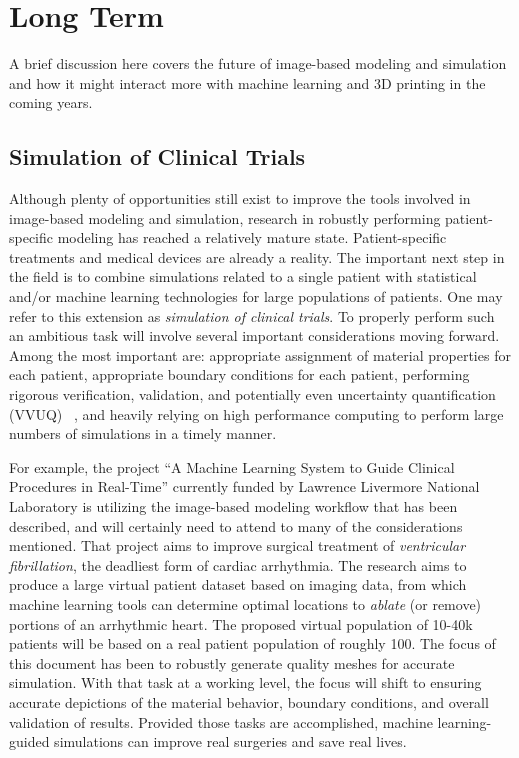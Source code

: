 \section{Long Term}
\label{Long Term}

A brief discussion here covers the future of image-based modeling and simulation and how it might interact more with machine learning and 3D printing in the coming years.

\subsection{Simulation of Clinical Trials}
\label{Simulation of Clinical Trials}

Although plenty of opportunities still exist to improve the tools involved in image-based modeling and simulation, research in robustly performing patient-specific modeling has reached a relatively mature state. Patient-specific treatments and medical devices are already a reality. The important next step in the field is to combine simulations related to a single patient with statistical and/or machine learning technologies for large populations of patients. One may refer to this extension as \textit{simulation of clinical trials}. To properly perform such an ambitious task will involve several important considerations moving forward. Among the most important are: appropriate assignment of material properties for each patient, appropriate boundary conditions for each patient, performing rigorous verification, validation, and potentially even uncertainty quantification (VVUQ) ~\cite{NAP13395}, and heavily relying on high performance computing to perform large numbers of simulations in a timely manner.

For example, the project ``A Machine Learning System to Guide Clinical Procedures in Real-Time'' currently funded by Lawrence Livermore National Laboratory is utilizing the image-based modeling workflow that has been described, and will certainly need to attend to many of the considerations mentioned. That project aims to improve surgical treatment of \textit{ventricular fibrillation}, the deadliest form of cardiac arrhythmia. The research aims to produce a large virtual patient dataset based on imaging data, from which machine learning tools can determine optimal locations to \textit{ablate} (or remove) portions of an arrhythmic heart. The proposed virtual population of 10-40k patients will be based on a real patient population of roughly 100. The focus of this document has been to robustly generate quality meshes for accurate simulation. With that task at a working level, the focus will shift to ensuring accurate depictions of the material behavior, boundary conditions, and overall validation of results. Provided those tasks are accomplished, machine learning-guided simulations can improve real surgeries and save real lives.

